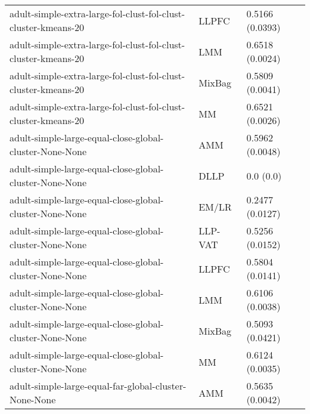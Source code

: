 \begin{longtable}{lll}
                                               adult-simple-extra-large-fol-clust-fol-clust-cluster-kmeans-20 &     LLPFC &                           0.5166 (0.0393) \\
                                               adult-simple-extra-large-fol-clust-fol-clust-cluster-kmeans-20 &       LMM &                           0.6518 (0.0024) \\
                                               adult-simple-extra-large-fol-clust-fol-clust-cluster-kmeans-20 &    MixBag &                           0.5809 (0.0041) \\
                                               adult-simple-extra-large-fol-clust-fol-clust-cluster-kmeans-20 &        MM &                           0.6521 (0.0026) \\
                                                      adult-simple-large-equal-close-global-cluster-None-None &       AMM &                           0.5962 (0.0048) \\
                                                      adult-simple-large-equal-close-global-cluster-None-None &      DLLP &                                 0.0 (0.0) \\
                                                      adult-simple-large-equal-close-global-cluster-None-None &     EM/LR &                           0.2477 (0.0127) \\
                                                      adult-simple-large-equal-close-global-cluster-None-None &   LLP-VAT &                           0.5256 (0.0152) \\
                                                      adult-simple-large-equal-close-global-cluster-None-None &     LLPFC &                           0.5804 (0.0141) \\
                                                      adult-simple-large-equal-close-global-cluster-None-None &       LMM &                           0.6106 (0.0038) \\
                                                      adult-simple-large-equal-close-global-cluster-None-None &    MixBag &                           0.5093 (0.0421) \\
                                                      adult-simple-large-equal-close-global-cluster-None-None &        MM &                           0.6124 (0.0035) \\
                                                        adult-simple-large-equal-far-global-cluster-None-None &       AMM &                           0.5635 (0.0042) \\

\end{longtable}
